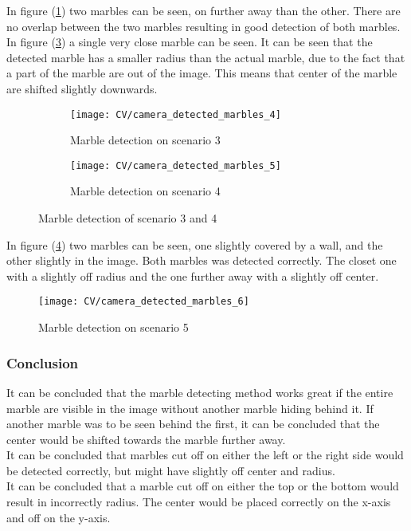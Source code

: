 \documentclass[../Head/Main.tex]{subfiles}
\begin{document}
In figure (\ref{fig:md_3}) two marbles can be seen, on further away than the other. There are no overlap between the two marbles resulting in good detection of both marbles.\\
In figure (\ref{fig:md_4}) a single very close marble can be seen. It can be seen that the detected marble has a smaller radius than the actual marble, due to the fact that a part of the marble are out of the image. This means that center of the marble are shifted slightly downwards.
\begin{figure}[H]
	\centering
	\begin{subfigure}[b]{0.45\textwidth}
		\centering
		\texttt{[image: CV/camera\_detected\_marbles\_4]}
		\caption{Marble detection on scenario 3}
		\label{fig:md_3}
	\end{subfigure}
	\hfill
	\begin{subfigure}[b]{0.45\textwidth}
		\centering
		\texttt{[image: CV/camera\_detected\_marbles\_5]}
		\caption{Marble detection on scenario 4}
		\label{fig:md_4}
	\end{subfigure}
	\caption{Marble detection of scenario 3 and 4}
\end{figure}

In figure (\ref{fig:md_5}) two marbles can be seen, one slightly covered by a wall, and the other slightly in the image. Both marbles was detected correctly. The closet one with a slightly off radius and the one further away with a slightly off center. 
\begin{figure}[H]
	\centering
	\texttt{[image: CV/camera\_detected\_marbles\_6]}
	\caption{Marble detection on scenario 5}
	\label{fig:md_5}
\end{figure}

\subsubsection*{Conclusion}
It can be concluded that the marble detecting method works great if the entire marble are visible in the image without another marble hiding behind it. If another marble was to be seen behind the first, it can be concluded that the center would be shifted towards the marble further away. \\
It can be concluded that marbles cut off on either the left or the right side would be detected correctly, but might have slightly off center and radius.\\
It can be concluded that a marble cut off on either the top or the bottom would result in incorrectly  radius. The center would be placed correctly on the x-axis and off on the y-axis. 
\end{document}
